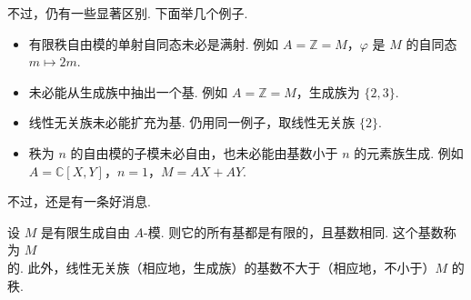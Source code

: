 不过，仍有一些显著区别. 下面举几个例子.
\begin{itemize}
\item 有限秩自由模的单射自同态未必是满射. 例如 $A=\mathbb Z=M$，$\varphi$ 是 $M$ 的自同态 $m\mapsto2m$.
\item 未必能从生成族中抽出一个基. 例如 $A=\mathbb Z=M$，生成族为 $\{2,3\}$.
\item 线性无关族未必能扩充为基. 仍用同一例子，取线性无关族 $\{2\}$.
\item 秩为 $n$ 的自由模的子模未必自由，也未必能由基数小于 $n$ 的元素族生成. 例如 $A=\mathbb C[X,Y]$，$n=1$，$M=AX+AY$.
\end{itemize}
不过，还是有一条好消息.
\begin{proposition*}
设 $M$ 是有限生成自由 $A$-模. 则它的所有基都是有限的，且基数相同. 这个基数称为 $M$ 的. 此外，线性无关族（相应地，生成族）的基数不大于（相应地，不小于）$M$ 的秩.
\end{proposition*}
